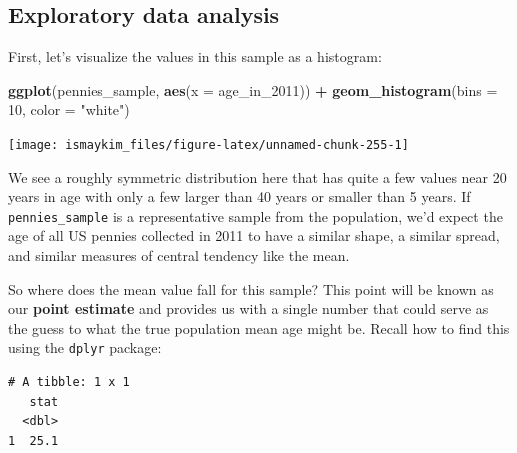 \documentclass[12pt, krantz2,]{krantz}
\makeatletter
\newenvironment{Shaded}{\begin{snugshade}}{\end{snugshade}}
\newcommand{\DataTypeTok}[1]{\textcolor[rgb]{0.27,0.27,0.27}{#1}}
\newcommand{\DecValTok}[1]{\textcolor[rgb]{0.06,0.06,0.06}{#1}}
\newcommand{\KeywordTok}[1]{\textcolor[rgb]{0.27,0.27,0.27}{\textbf{#1}}}
\newcommand{\NormalTok}[1]{#1}
\newcommand{\OperatorTok}[1]{\textcolor[rgb]{0.43,0.43,0.43}{\textbf{#1}}}
\newcommand{\StringTok}[1]{\textcolor[rgb]{0.5,0.5,0.5}{#1}}
\newenvironment{kframe}{%
\medskip{}
\setlength{\fboxsep}{.8em}
 \def\at@end@of@kframe{}%
 \ifinner\ifhmode%
  \def\at@end@of@kframe{\end{minipage}}%
  \begin{minipage}{\columnwidth}%
 \fi\fi%
 \def\FrameCommand##1{\hskip\@totalleftmargin \hskip-\fboxsep
 \colorbox{shadecolor}{##1}\hskip-\fboxsep
     \hskip-\linewidth \hskip-\@totalleftmargin \hskip\columnwidth}%
 \MakeFramed {\advance\hsize-\width
   \@totalleftmargin\z@ \linewidth\hsize
   \@setminipage}}%
 {\par\unskip\endMakeFramed%
 \at@end@of@kframe}
\renewenvironment{Shaded}{\begin{kframe}}{\end{kframe}}
\makeatother
\begin{document}
\hypertarget{exploratory-data-analysis}{%
\subsection{Exploratory data analysis}\label{exploratory-data-analysis}}

First, let's visualize the values in this sample as a histogram:

\begin{Shaded}
\begin{Highlighting}[]
\KeywordTok{ggplot}\NormalTok{(pennies_sample, }\KeywordTok{aes}\NormalTok{(}\DataTypeTok{x =}\NormalTok{ age_in_}\DecValTok{2011}\NormalTok{)) }\OperatorTok{+}
\StringTok{  }\KeywordTok{geom_histogram}\NormalTok{(}\DataTypeTok{bins =} \DecValTok{10}\NormalTok{, }\DataTypeTok{color =} \StringTok{"white"}\NormalTok{)}
\end{Highlighting}
\end{Shaded}

\begin{center}\texttt{[image: ismaykim\_files/figure-latex/unnamed-chunk-255-1]} \end{center}

We see a roughly symmetric distribution here that has quite a few values near 20 years in age with only a few larger than 40 years or smaller than 5 years. If \texttt{pennies\_sample} is a representative sample from the population, we'd expect the age of all US pennies collected in 2011 to have a similar shape, a similar spread, and similar measures of central tendency like the mean.

So where does the mean value fall for this sample? This point will be known as our \textbf{point estimate} and provides us with a single number that could serve as the guess to what the true population mean age might be. Recall how to find this using the \texttt{dplyr} package:

\begin{Shaded}
\end{Shaded}

\begin{verbatim}
# A tibble: 1 x 1
   stat
  <dbl>
1  25.1
\end{verbatim}
\end{document}
